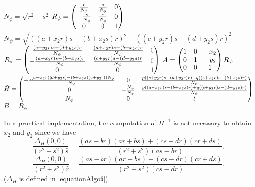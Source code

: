    \begin{algorithme}
     \label{pseudoCodeDecompo}
     \caption{$decomposition(H)$}
     $N_\phi = \sqrt{r^2+s^2}$\;
     $R_\phi = \begin{pmatrix} 
      \frac{r}{N_\phi} & \frac{s}{N_\phi} & 0\\
      -\frac{s}{N_\phi} & \frac{r}{N_\phi} & 0\\
      0 & 0 & 1 \end{pmatrix}$\;
     $N_\psi = \sqrt{((a+x_2r)s-(b+x_2s)r)^2+((c+y_2r)s-(d+y_2s)r)^2}$\;
     $R_\psi = \begin{pmatrix} 
      \frac{(c+y_2r)s-(d+y_2s)r}{N_\psi} & \frac{(a+x_2r)s-(b+x_2s)r}{N_\psi} & 0\\
      -\frac{(a+x_2r)s-(b+x_2s)r}{N_\psi} & \frac{(c+y_2r)s-(d+y_2s)r}{N_\psi} & 0\\
      0 & 0 & 1 \end{pmatrix}$\;
     $A = \begin{pmatrix} 1&0&-x_2\\0&1&-y_2\\0&0&1 \end{pmatrix}R_\psi$\;
     $\tilde H = \begin{pmatrix} 
      -\frac{((a+x_2r)(d+y_2s)-(b+x_2s)(c+y_2r))N_\phi}{N_\psi} & 0 & \frac{p((c+y_2r)s-(d+y_2s)r)-q((a+x_2r)s-(b+x_2s)r)}{N_\psi}\\
      0 & -\frac{N_\psi}{N_\phi} & \frac{p((a+x_2r)s-(b+x_2s)r)+q((c+y_2r)s-(d+y_2s)r)}{N_\psi}\\
      N_\phi & 0 & t \end{pmatrix}$\;
     $B = R_\phi$\;
   \end{algorithme}
   
   In a practical implementation, the computation of $H^{-1}$ is not necessary to obtain $x_2$ and $y_2$ since we have
   \[\frac{\Delta_H(0,0)}{(r^2+s^2)\hat s} = \frac{(as-br)(ar+bs)+(cs-dr)(cr+ds)}{(r^2+s^2)(as-br)},\]
 \[\frac{\Delta_H(0,0)}{(r^2+s^2)\hat r} = \frac{(as-br)(ar+bs)+(cs-dr)(cr+ds)}{(r^2+s^2)(cs-dr)}.\]
 ($\Delta_H$ is defined in \eqref{equationAlgo6}).
   

